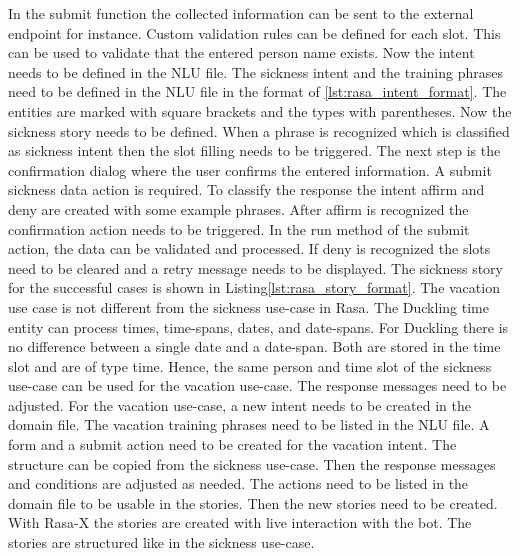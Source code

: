 In the submit function the collected information can be sent to the 
external endpoint for instance.
Custom validation rules can be defined for each slot.
This can be used to validate that the entered person name exists.
Now the intent needs to be defined in the NLU file.
The sickness intent and the training phrases need to be defined in the 
NLU  file in the format of \ref{lst:rasa_intent_format}.
The entities are marked with square brackets and the types with parentheses.
Now the sickness story needs to be defined.
When a phrase is recognized which is classified as sickness intent then 
the slot filling needs to be triggered.
The next step is the confirmation dialog where the user confirms the entered information.
A submit sickness data action is required.
To classify the response the intent affirm and deny are created with some example phrases.
After affirm is recognized the confirmation action needs to be triggered.
In the run method of the submit action, the data can be validated and processed.
If deny is recognized the slots need to be cleared and a retry message needs to be displayed.
The sickness story for the successful cases is shown in Listing\ref{lst:rasa_story_format}.
The vacation use case is not different from the sickness use-case in Rasa.
The Duckling time entity can process times, time-spans, dates, and date-spans.
For Duckling there is no difference between a single date and a date-span.
Both are stored in the time slot and are of type time.
Hence, the same person and time slot of the sickness use-case can be used for the 
vacation use-case.
The response messages need to be adjusted.
For the vacation use-case, a new intent needs to be created in the domain file.
The vacation training phrases need to be listed in the NLU file.
A form and a submit action need to be created for the vacation intent.
The structure can be copied from the sickness use-case.
Then the response messages and conditions are adjusted as needed.
The actions need to be listed in the domain file to be usable in the stories.
Then the new stories need to be created.
With Rasa-X the stories are created with live interaction with the bot.
The stories are structured like in the sickness use-case.








